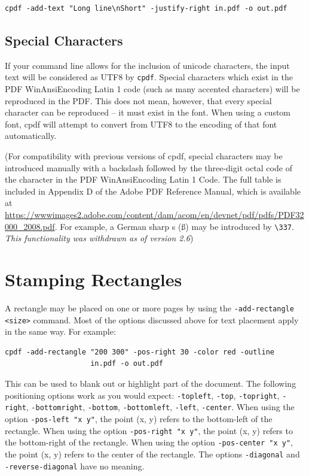 \documentclass{book}
\begin{document}
\begin{framed}
  \noindent\small\begin{verbatim}cpdf -add-text "Long line\nShort" -justify-right in.pdf -o out.pdf\end{verbatim}
\end{framed}

\subsection{Special Characters}

If your command line allows for the inclusion of unicode characters, the input
text will be considered as UTF8 by \verb!cpdf!. Special characters which exist
in the PDF WinAnsiEncoding Latin 1 code (such as many accented characters) will
be reproduced in the PDF. This does not mean, however, that every special
character can be reproduced -- it must exist in the font. When using a custom font, cpdf will attempt to convert from UTF8 to the encoding of that font automatically.

(For compatibility with previous versions of cpdf, special characters may be
introduced manually with a backslash followed by the three-digit octal code of
the character in the PDF WinAnsiEncoding Latin 1 Code. The full table is
included in Appendix D of the Adobe PDF Reference Manual, which is available at
\url{https://wwwimages2.adobe.com/content/dam/acom/en/devnet/pdf/pdfs/PDF32000_2008.pdf}. For example, a German sharp s (\ss) may be introduced by \verb!\337!. \textit{This functionality was withdrawn as of version 2.6})

\section{Stamping Rectangles}

A rectangle may be placed on one or more pages by using the \texttt{-add-rectangle <size>} command. Most of the options discussed above for text placement apply in the same way. For example:

\begin{framed}
  \small\begin{verbatim}cpdf -add-rectangle "200 300" -pos-right 30 -color red -outline
                    in.pdf -o out.pdf\end{verbatim}
\end{framed}

\noindent This can be used to blank out or highlight part of the document. The following positioning options work as you would expect: \texttt{-topleft}, \texttt{-top}, \texttt{-topright}, \texttt{-right}, \texttt{-bottomright}, \texttt{-bottom}, \texttt{-bottomleft}, \texttt{-left}, \texttt{-center}. When using the option \texttt{-pos-left "x y"}, the point (x, y) refers to the bottom-left of the rectangle. When using the option \texttt{-pos-right "x y"}, the point (x, y) refers to the bottom-right of the rectangle. When using the option \texttt{-pos-center "x y"}, the point (x, y) refers to the center of the rectangle. The options \texttt{-diagonal} and \texttt{-reverse-diagonal} have no meaning.\pagestyle{empty}\thispagestyle{fancy}
\end{document}
